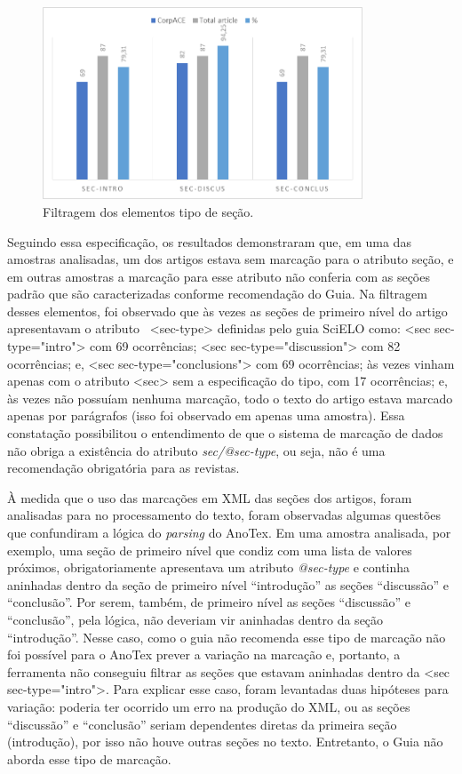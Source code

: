 \documentclass[portuguese]{textolivre}
\begin{document}
\begin{figure}[htbp]
 \centering
 \includegraphics[width=0.85\textwidth]{Fig12.png}
 \caption{Filtragem dos elementos tipo de seção.}
 \label{fig-12}
\end{figure}

Seguindo essa especificação, os resultados demonstraram que, em uma das amostras analisadas, um dos artigos estava sem marcação para o atributo seção, e em outras amostras a marcação para esse atributo não conferia com as seções padrão que são caracterizadas conforme recomendação do Guia. Na filtragem desses elementos, foi observado que às vezes as seções de primeiro nível do artigo apresentavam o atributo  <sec-type> definidas pelo guia SciELO como: <sec sec-type="intro"> com 69 ocorrências; <sec sec-type="discussion"> com 82 ocorrências; e, <sec sec-type="conclusions"> com 69 ocorrências; às vezes vinham apenas com o atributo <sec> sem a especificação do tipo, com 17 ocorrências; e, às vezes não possuíam nenhuma marcação, todo o texto do artigo estava marcado apenas por parágrafos (isso foi observado em apenas uma amostra). Essa constatação possibilitou o entendimento de que o sistema de marcação de dados não obriga a existência do atributo \textit{sec/@sec-type}, ou seja, não é uma recomendação obrigatória para as revistas.

À medida que o uso das marcações em XML das seções dos artigos, foram analisadas para no processamento do texto, foram observadas algumas questões que confundiram a lógica do \textit{parsing} do AnoTex. Em uma amostra analisada, por exemplo, uma seção de primeiro nível que condiz com uma lista de valores próximos, obrigatoriamente apresentava um atributo \textit{@sec-type} e continha aninhadas dentro da seção de primeiro nível “introdução” as seções “discussão” e “conclusão”. Por serem, também, de primeiro nível as seções “discussão” e “conclusão”, pela lógica, não deveriam vir aninhadas dentro da seção “introdução”. Nesse caso, como o guia não recomenda esse tipo de marcação não foi possível para o AnoTex prever a variação na marcação e, portanto, a ferramenta não conseguiu filtrar as seções que estavam aninhadas dentro da <sec sec-type="intro">. Para explicar esse caso, foram levantadas duas hipóteses para variação: poderia ter ocorrido um erro na produção do XML, ou as seções “discussão” e “conclusão” seriam dependentes diretas da primeira seção (introdução), por isso não houve outras seções no texto. Entretanto, o Guia não aborda esse tipo de marcação.
\end{document}
